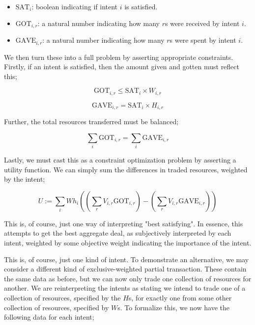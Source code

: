 \begin{itemize}
    \item $\text{SAT}_i$:  boolean indicating if intent $i$ is satisfied.
    \item $\text{GOT}_{i, r}$: a natural number indicating how many $r$s were received by intent $i$.
    \item $\text{GAVE}_{i, r}$: a natural number indicating how many $r$s were spent by intent $i$.
\end{itemize}

We then turn these into a full problem by asserting appropriate constraints. Firstly, if an intent is satisfied, then the amount given and gotten must reflect this;

\begin{equation}
    \text{GOT}_{i, r} \leq \text{SAT}_i \times W_{i, r}
\end{equation}

\begin{equation}
    \text{GAVE}_{i, r} = \text{SAT}_i \times H_{i, r}
\end{equation}

Further, the total resources transferred must be balanced;

\begin{equation}
    \sum_{i} \text{GOT}_{i, r} = \sum_{i} \text{GAVE}_{i, r}
\end{equation}

Lastly, we must cast this as a constraint optimization problem by asserting a utility function. We can simply sum the differences in traded resources, weighted by the intent;

\begin{equation}
    U := \sum_i Wh_i \left(\left(\sum_r V_{i, r} \text{GOT}_{i, r}\right) - \left(\sum_r V_{i, r} \text{GAVE}_{i, r}\right)\right)
\end{equation}

This is, of course, just one way of interpreting "best satisfying". In essence, this attempts to get the best aggregate deal, as subjectively interpreted by each intent, weighted by some objective weight indicating the importance of the intent.

This is, of course, just one kind of intent. To demonstrate an alternative, we may consider a different kind of exclusive-weighted partial transaction. These contain the same data as before, but we can now only trade one collection of resources for another. We are reinterpreting the intents as stating we intend to trade one of a collection of resources, specified by the $H$s, for exactly one from some other collection of resources, specified by $W$s. To formalize this, we now have the following data for each intent;

